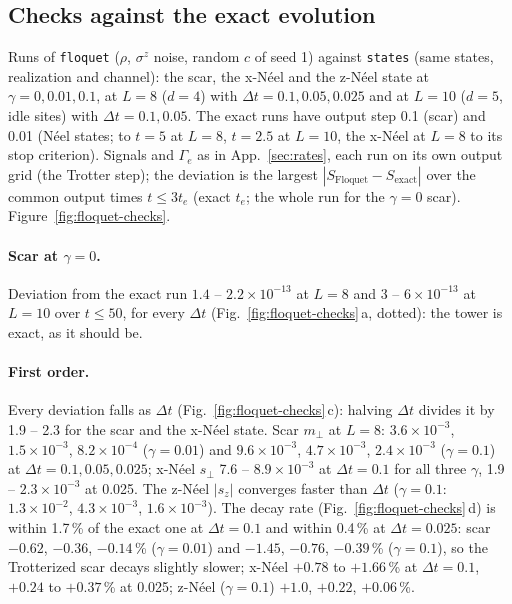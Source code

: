 \subsection{Checks against the exact evolution}
\label{sec:floquet-checks}

Runs of \texttt{floquet} ($\rho$, $\sigma^z$ noise, random $c$ of seed 1) against \texttt{states} (same states, realization and channel): the scar, the x-Néel and the z-Néel state at $\gamma = 0, 0.01, 0.1$, at $L = 8$ ($d = 4$) with $\Delta t = 0.1, 0.05, 0.025$ and at $L = 10$ ($d = 5$, idle sites) with $\Delta t = 0.1, 0.05$. The exact runs have output step 0.1 (scar) and 0.01 (Néel states; to $t = 5$ at $L = 8$, $t = 2.5$ at $L = 10$, the x-Néel at $L = 8$ to its stop criterion). Signals and $\Gamma_e$ as in App.~\ref{sec:rates}, each run on its own output grid (the Trotter step); the deviation is the largest $|S_{\mathrm{Floquet}} - S_{\mathrm{exact}}|$ over the common output times $t \le 3t_e$ (exact $t_e$; the whole run for the $\gamma = 0$ scar). Figure~\ref{fig:floquet-checks}.

\paragraph{Scar at $\gamma = 0$.} Deviation from the exact run $1.4$ -- $2.2\times10^{-13}$ at $L = 8$ and $3$ -- $6\times10^{-13}$ at $L = 10$ over $t \le 50$, for every $\Delta t$ (Fig.~\ref{fig:floquet-checks}\,a, dotted): the tower is exact, as it should be.

\paragraph{First order.} Every deviation falls as $\Delta t$ (Fig.~\ref{fig:floquet-checks}\,c): halving $\Delta t$ divides it by 1.9 -- 2.3 for the scar and the x-Néel state. Scar $m_\perp$ at $L = 8$: $3.6\times10^{-3}$, $1.5\times10^{-3}$, $8.2\times10^{-4}$ ($\gamma = 0.01$) and $9.6\times10^{-3}$, $4.7\times10^{-3}$, $2.4\times10^{-3}$ ($\gamma = 0.1$) at $\Delta t = 0.1, 0.05, 0.025$; x-Néel $s_\perp$ 7.6 -- $8.9\times10^{-3}$ at $\Delta t = 0.1$ for all three $\gamma$, 1.9 -- $2.3\times10^{-3}$ at 0.025. The z-Néel $|s_z|$ converges faster than $\Delta t$ ($\gamma = 0.1$: $1.3\times10^{-2}$, $4.3\times10^{-3}$, $1.6\times10^{-3}$). The decay rate (Fig.~\ref{fig:floquet-checks}\,d) is within 1.7\,\% of the exact one at $\Delta t = 0.1$ and within 0.4\,\% at $\Delta t = 0.025$: scar $-0.62$, $-0.36$, $-0.14$\,\% ($\gamma = 0.01$) and $-1.45$, $-0.76$, $-0.39$\,\% ($\gamma = 0.1$), so the Trotterized scar decays slightly slower; x-Néel $+0.78$ to $+1.66$\,\% at $\Delta t = 0.1$, $+0.24$ to $+0.37$\,\% at 0.025; z-Néel ($\gamma = 0.1$) $+1.0$, $+0.22$, $+0.06$\,\%.


